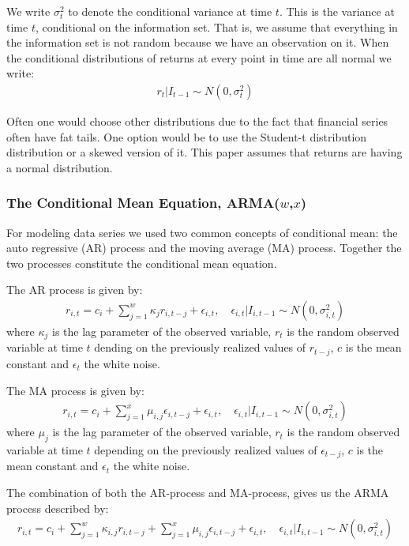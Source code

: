 We write $\sigma_t^2$ to denote the conditional variance at time $t$. This is the variance at time $t$, conditional on the information set. That is, we assume that everything in the information set is not random because we have an observation on it. When the conditional distributions of returns at every point in time are all normal we write:
\begin{align}
    r_t | I_{t-1} \sim N(0,{\sigma_t^2})
\end{align}

Often one would choose other distributions due to the fact that financial series often have fat tails. One option would be to use the Student-t distribution distribution or a skewed version of it. This paper assumes that returns are having a normal distribution. 

\subsubsection{The Conditional Mean Equation, ARMA($w$,$x$)}

For modeling data series we used two common concepts of conditional mean: the auto regressive (AR) process and the moving average (MA) process. Together the two processes constitute the conditional mean equation. 

The AR process is given by:
\begin{align}
    r_{i,t}=c_i + \sum_{j=1}^w\kappa_j r_{i,t-j} + \epsilon_{i,t},\quad \epsilon_{i,t} | I_{i,t-1} \sim N(0,{\sigma_{i,t}^2}) \label{ConditionalMeanEquation}
\end{align}
where $\kappa_j$ is the lag parameter of the observed variable, $r_t$ is the random observed variable at time $t$ dending on the previously realized values of $r_{t-j}$, $c$ is the mean constant and $\epsilon_t$ the white noise.

The MA process is given by:
\begin{align}
    r_{i,t}=c_i + \sum_{j=1}^x\mu_{i,j} \epsilon_{i,t-j} + \epsilon_{i,t},\quad \epsilon_{i,t} | I_{i,t-1} \sim N(0,{\sigma_{i,t}^2}) \label{ConditionalMeanEquation}
\end{align}
where $\mu_j$ is the lag parameter of the observed variable, $r_t$ is the random observed variable at time $t$ depending on the previously realized values of $\epsilon_{t-j}$, $c$ is the mean constant and $\epsilon_t$ the white noise.

The combination of both the AR-process and MA-process, gives us the ARMA process described by:
\begin{align}
    r_{i,t}=c_i+\sum_{j=1}^w\kappa_{i,j} r_{i,t-j}+\sum_{j=1}^x\mu_{i,j} \epsilon_{i,t-j}+\epsilon_{i,t},\quad \epsilon_{i,t} | I_{i,t-1} \sim N(0,{\sigma_{i,t}^2}) \label{ConditionalMeanEquation}
\end{align}

